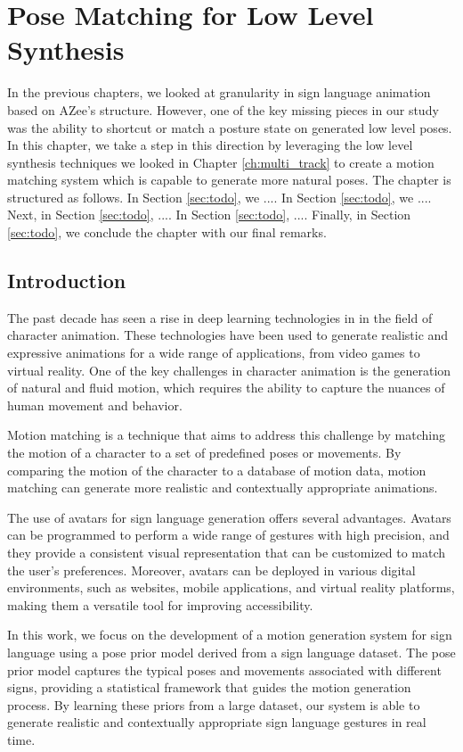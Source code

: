 \documentclass[../../main.tex]{subfiles}
\begin{document}
\chapter{Pose Matching for Low Level Synthesis}

In the previous chapters, we looked at granularity in sign language animation based on AZee's structure. However, one of the key missing pieces in our study was the ability to shortcut or match a posture state on generated low level poses. In this chapter, we take a step in this direction by leveraging the low level synthesis techniques we looked in Chapter \ref{ch:multi_track} to create a motion matching system which is capable to generate more natural poses.
The chapter is structured as follows. In Section \ref{sec:todo}, we .... In Section \ref{sec:todo}, we .... Next, in Section \ref{sec:todo}, .... In Section \ref{sec:todo}, .... Finally, in Section \ref{sec:todo}, we conclude the chapter with our final remarks.

\section{Introduction}

The past decade has seen a rise in deep learning technologies in in the field of character animation. These technologies have been used to generate realistic and expressive animations for a wide range of applications, from video games to virtual reality. One of the key challenges in character animation is the generation of natural and fluid motion, which requires the ability to capture the nuances of human movement and behavior. 

Motion matching is a technique that aims to address this challenge by matching the motion of a character to a set of predefined poses or movements. By comparing the motion of the character to a database of motion data, motion matching can generate more realistic and contextually appropriate animations.

The use of avatars for sign language generation offers several advantages. Avatars can be programmed to perform a wide range of gestures with high precision, and they provide a consistent visual representation that can be customized to match the user's preferences. Moreover, avatars can be deployed in various digital environments, such as websites, mobile applications, and virtual reality platforms, making them a versatile tool for improving accessibility.

In this work, we focus on the development of a motion generation system for sign language using a pose prior model derived from a sign language dataset. The pose prior model captures the typical poses and movements associated with different signs, providing a statistical framework that guides the motion generation process. By learning these priors from a large dataset, our system is able to generate realistic and contextually appropriate sign language gestures in real time.
\end{document}
